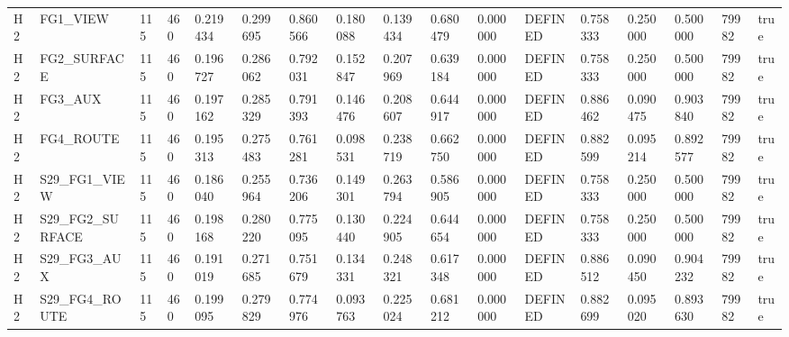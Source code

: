 \begin{tabular}{lllllllllllllllll}
H2 & FG1\_VIEW & 115 & 460 & 0.219434 & 0.299695 & 0.860566 & 0.180088 & 0.139434 & 0.680479 & 0.000000 & DEFINED & 0.758333 & 0.250000 & 0.500000 & 79982 & true \\
H2 & FG2\_SURFACE & 115 & 460 & 0.196727 & 0.286062 & 0.792031 & 0.152847 & 0.207969 & 0.639184 & 0.000000 & DEFINED & 0.758333 & 0.250000 & 0.500000 & 79982 & true \\
H2 & FG3\_AUX & 115 & 460 & 0.197162 & 0.285329 & 0.791393 & 0.146476 & 0.208607 & 0.644917 & 0.000000 & DEFINED & 0.886462 & 0.090475 & 0.903840 & 79982 & true \\
H2 & FG4\_ROUTE & 115 & 460 & 0.195313 & 0.275483 & 0.761281 & 0.098531 & 0.238719 & 0.662750 & 0.000000 & DEFINED & 0.882599 & 0.095214 & 0.892577 & 79982 & true \\
H2 & S29\_FG1\_VIEW & 115 & 460 & 0.186040 & 0.255964 & 0.736206 & 0.149301 & 0.263794 & 0.586905 & 0.000000 & DEFINED & 0.758333 & 0.250000 & 0.500000 & 79982 & true \\
H2 & S29\_FG2\_SURFACE & 115 & 460 & 0.198168 & 0.280220 & 0.775095 & 0.130440 & 0.224905 & 0.644654 & 0.000000 & DEFINED & 0.758333 & 0.250000 & 0.500000 & 79982 & true \\
H2 & S29\_FG3\_AUX & 115 & 460 & 0.191019 & 0.271685 & 0.751679 & 0.134331 & 0.248321 & 0.617348 & 0.000000 & DEFINED & 0.886512 & 0.090450 & 0.904232 & 79982 & true \\
H2 & S29\_FG4\_ROUTE & 115 & 460 & 0.199095 & 0.279829 & 0.774976 & 0.093763 & 0.225024 & 0.681212 & 0.000000 & DEFINED & 0.882699 & 0.095020 & 0.893630 & 79982 & true \\
\bottomrule
\end{tabular}
